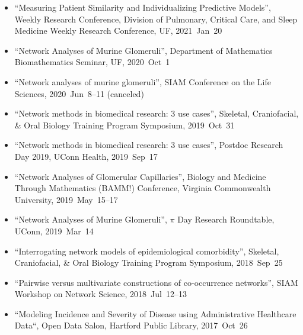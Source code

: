 \documentclass[10pt,a4paper]{article}
\begin{document}
\begin{itemize}[label=$\circ$,nolistsep]
\item
``Measuring Patient Similarity and Individualizing Predictive Models'', Weekly Research Conference, Division of Pulmonary, Critical Care, and Sleep Medicine Weekly Research Conference, UF, 2021~Jan~20
\item
``Network Analyses of Murine Glomeruli'', Department of Mathematics Biomathematics Seminar, UF, 2020~Oct~1
\item
``Network analyses of murine glomeruli'', SIAM Conference on the Life Sciences, 2020~Jun~8--11 (canceled)
\item
``Network methods in biomedical research: 3 use cases'', Skeletal, Craniofacial, \& Oral Biology Training Program Symposium, 2019~Oct~31
\item
``Network methods in biomedical research: 3 use cases'', Postdoc Research Day 2019, UConn Health, 2019~Sep~17
\item
``Network Analyses of Glomerular Capillaries'', Biology and Medicine Through Mathematics (BAMM!) Conference, Virginia Commonwealth University, 2019~May~15--17
\item
``Network Analyses of Murine Glomeruli'', $\pi$ Day Research Roundtable, UConn, 2019~Mar~14
\item
``Interrogating network models of epidemiological comorbidity'', Skeletal, Craniofacial, \& Oral Biology Training Program Symposium, 2018~Sep~25
\item
``Pairwise versus multivariate constructions of co-occurrence networks'', SIAM Workshop on Network Science, 2018~Jul~12--13
\item
``Modeling Incidence and Severity of Disease using Administrative Healthcare Data``, Open Data Salon, Hartford Public Library, 2017~Oct~26

\end{itemize}
\end{document}
